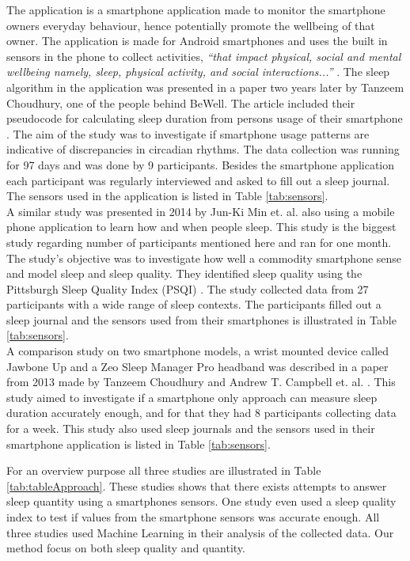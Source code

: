 \documentclass[12pt]{article} %
\begin{document}
The application is a smartphone application made to monitor the smartphone owners everyday behaviour, hence potentially promote the wellbeing of that owner. The application is made for Android smartphones and uses the built in sensors in the phone to collect activities, \textit{``that impact physical, social and mental wellbeing namely, sleep, physical activity, and social interactions...''} \cite{beWell}. The sleep algorithm in the application was presented in a paper two years later by Tanzeem Choudhury, one of the people behind BeWell. The article included their pseudocode for calculating sleep duration from persons usage of their smartphone \cite{bewellSleep}. The aim of the study was to investigate if smartphone usage patterns are indicative of discrepancies in circadian rhythms. The data collection was running for 97 days and was done by 9 participants. Besides the smartphone application each participant was regularly interviewed and asked to fill out a sleep journal. The sensors used in the application is listed in Table \ref{tab:sensors}.\\ 

A similar study was presented in 2014 by Jun-Ki Min et. al. \cite{toss} also using a mobile phone application to learn how and when people sleep. This study is the biggest study regarding number of participants mentioned here and ran for one month. The study's objective was to investigate how well a commodity smartphone sense and model sleep and sleep quality. They identified sleep quality using the Pittsburgh Sleep Quality Index (PSQI) \cite{quality}. The study collected data from 27 participants with a wide range of sleep contexts.  The participants filled out a sleep journal and the sensors used from their smartphones is illustrated in Table \ref{tab:sensors}. \\

A comparison study on two smartphone models, a wrist mounted device called Jawbone Up and a Zeo Sleep Manager Pro headband was described in a paper from 2013 made by Tanzeem Choudhury and Andrew T. Campbell et. al. \cite{compare}. This study aimed to investigate if a smartphone only approach can measure sleep duration accurately enough, and for that they had 8 participants collecting data for a week. This study also used sleep journals and the sensors used in their smartphone application is listed in Table \ref{tab:sensors}. 

For an overview purpose all three studies are illustrated in Table \ref{tab:tableApproach}. These studies shows that there exists attempts to answer sleep quantity using a smartphones sensors. One study even used a sleep quality index to test if values from the smartphone sensors was accurate enough. All three studies used Machine Learning in their analysis of the collected data. Our method focus on both sleep quality and quantity. 
\end{document}
